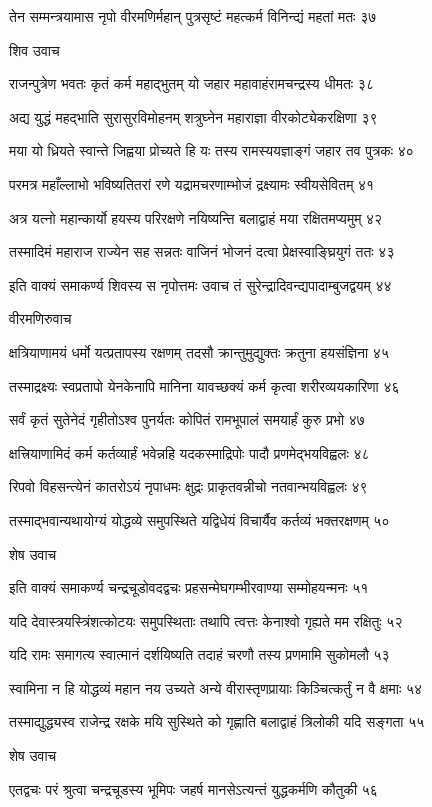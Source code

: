 तेन सम्मन्त्रयामास नृपो वीरमणिर्महान्
पुत्रसृष्टं महत्कर्म विनिन्द्यं महतां मतः ३७

शिव उवाच

राजन्पुत्रेण भवतः कृतं कर्म महाद्भुतम्
यो जहार महावाहंरामचन्द्रस्य धीमतः ३८

अद्य युद्धं महद्भाति सुरासुरविमोहनम्
शत्रुघ्नेन महाराज्ञा वीरकोट्येकरक्षिणा ३९

मया यो ध्रियते स्वान्ते जिह्वया प्रोच्यते हि यः
तस्य रामस्ययज्ञाङ्गं जहार तव पुत्रकः ४०

परमत्र महाँल्लाभो भविष्यतितरां रणे
यद्रामचरणाम्भोजं द्रक्ष्यामः स्वीयसेवितम् ४१

अत्र यत्नो महान्कार्यो हयस्य परिरक्षणे
नयिष्यन्ति बलाद्वाहं मया रक्षितमप्यमुम् ४२

तस्मादिमं महाराज राज्येन सह सन्नतः
वाजिनं भोजनं दत्वा प्रेक्षस्वाङ्घ्रियुगं ततः ४३

इति वाक्यं समाकर्ण्य शिवस्य स नृपोत्तमः
उवाच तं सुरेन्द्रादिवन्द्यपादाम्बुजद्वयम् ४४

वीरमणिरुवाच

क्षत्रियाणामयं धर्मो यत्प्रतापस्य रक्षणम्
तदसौ क्रान्तुमुद्युक्तः क्रतुना हयसंज्ञिना ४५

तस्माद्रक्ष्यः स्वप्रतापो येनकेनापि मानिना
यावच्छक्यं कर्म कृत्वा शरीरव्ययकारिणा ४६

सर्वं कृतं सुतेनेदं गृहीतोऽश्व पुनर्यतः
कोपितं रामभूपालं समयार्हं कुरु प्रभो ४७

क्षत्त्रियाणामिदं कर्म कर्तव्यार्हं भवेन्नहि
यदकस्माद्रिपोः पादौ प्रणमेद्भयविह्वलः ४८

रिपवो विहसन्त्येनं कातरोऽयं नृपाधमः
क्षुद्रः प्राकृतवन्नीचो नतवान्भयविह्वलः ४९

तस्माद्भवान्यथायोग्यं योद्धव्ये समुपस्थिते
यद्विधेयं विचार्यैव कर्तव्यं भक्तरक्षणम् ५०

शेष उवाच

इति वाक्यं समाकर्ण्य चन्द्रचूडोवदद्वचः
प्रहसन्मेघगम्भीरवाण्या सम्मोहयन्मनः ५१

यदि देवास्त्रयस्त्रिंशत्कोटयः समुपस्थिताः
तथापि त्वत्तः केनाश्वो गृह्यते मम रक्षितुः ५२

यदि रामः समागत्य स्वात्मानं दर्शयिष्यति
तदाहं चरणौ तस्य प्रणमामि सुकोमलौ ५३

स्वामिना न हि योद्धव्यं महान नय उच्यते
अन्ये वीरास्तृणप्रायाः किञ्चित्कर्तुं न वै क्षमाः ५४

तस्माद्युद्ध्यस्व राजेन्द्र रक्षके मयि सुस्थिते
को गृह्णाति बलाद्वाहं त्रिलोकी यदि सङ्गता ५५

शेष उवाच

एतद्वचः परं श्रुत्वा चन्द्रचूडस्य भूमिपः
जहर्ष मानसेऽत्यन्तं युद्धकर्मणि कौतुकी ५६

